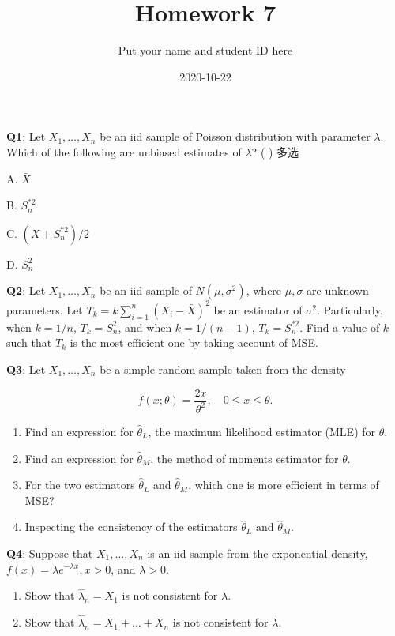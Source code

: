 \documentclass[]{article}
\title{Homework 7}
\author{Put your name and student ID here}
\date{2020-10-22}
\begin{document}
\maketitle

\textbf{Q1}: Let \(X_1,\dots,X_n\) be an iid sample of Poisson
distribution with parameter \(\lambda\). Which of the following are
unbiased estimates of \(\lambda\)? ( ) 多选

A. \(\bar X\)

B. \(S_n^{*2}\)

C. \((\bar X+S_n^{*2})/2\)

D. \(S_n^2\)

\textbf{Q2}: Let \(X_1,\dots,X_n\) be an iid sample of
\(N(\mu,\sigma^2)\), where \(\mu,\sigma\) are unknown parameters. Let
\(T_k=k\sum_{i=1}^n(X_i-\bar X)^2\) be an estimator of \(\sigma^2\).
Particularly, when \(k=1/n\), \(T_k=S_n^2\), and when \(k=1/(n-1)\),
\(T_k=S_n^{*2}\). Find a value of \(k\) such that \(T_k\) is the most
efficient one by taking account of MSE.

\textbf{Q3}: Let \(X_1,\dots,X_n\) be a simple random sample taken from
the density

\[f(x;\theta)=\frac{2x}{\theta^2},\quad 0\le x\le \theta.\]

\begin{enumerate}
\def\labelenumi{\arabic{enumi}.}
\item
  Find an expression for \(\hat\theta_L\), the maximum likelihood
  estimator (MLE) for \(\theta\).
\item
  Find an expression for \(\hat\theta_M\), the method of moments
  estimator for \(\theta\).
\item
  For the two estimators \(\hat\theta_L\) and \(\hat\theta_M\), which
  one is more efficient in terms of MSE?
\item
  Inspecting the consistency of the estimators \(\hat\theta_L\) and
  \(\hat\theta_M\).
\end{enumerate}

\textbf{Q4}: Suppose that \(X_1,\dots,X_n\) is an iid sample from the
exponential density, \(f(x)=\lambda e^{-\lambda x},x>0\), and
\(\lambda>0\).

\begin{enumerate}
\def\labelenumi{(\alph{enumi})}
\item
  Show that \(\hat\lambda_n=X_1\) is not consistent for \(\lambda\).
\item
  Show that \(\hat\lambda_n=X_1+\dots+X_n\) is not consistent for
  \(\lambda\).
\end{enumerate}
\end{document}
